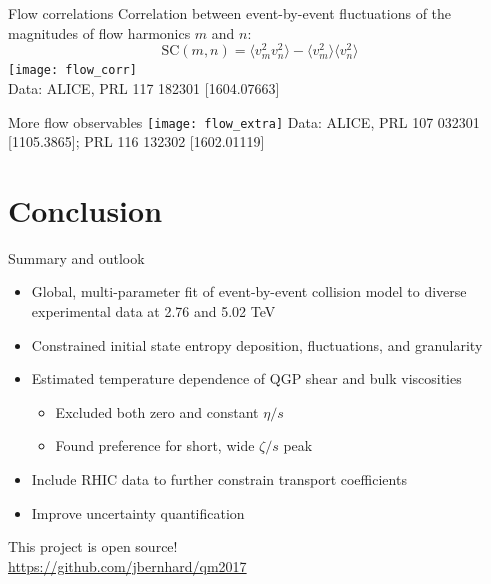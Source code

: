 \documentclass{beamer}
\begin{document}
\begin{frame}{Flow correlations}
  Correlation between event-by-event fluctuations of the magnitudes of flow harmonics $m$ and $n$:
  \begin{equation*}
    \text{SC}(m, n) = \langle v_m^2 v_n^2 \rangle  - \langle v_m^2 \rangle \langle v_n^2 \rangle
  \end{equation*}
  \texttt{[image: flow\_corr]} \\
  \tiny\flushright Data: ALICE, PRL 117 182301 [1604.07663]
\end{frame}


\begin{frame}{More flow observables}
  \texttt{[image: flow\_extra]}
  \tiny\flushright Data: ALICE, PRL 107 032301 [1105.3865]; PRL 116 132302 [1602.01119]
\end{frame}


\section{Conclusion}

\begin{frame}{Summary and outlook}
  \vspace{1em}
  \begin{itemize}
    \item Global, multi-parameter fit of event-by-event collision model to diverse experimental data at 2.76 and 5.02 TeV
    \item Constrained initial state entropy deposition, fluctuations, and granularity
    \item Estimated temperature dependence of QGP shear and bulk viscosities
      \begin{itemize}
        \item Excluded both zero and constant $\eta/s$
        \item Found preference for short, wide $\zeta/s$ peak
      \end{itemize}
  \end{itemize}
  \begin{itemize}
    \item Include RHIC data to further constrain transport coefficients
    \item Improve uncertainty quantification
  \end{itemize}
  \begin{center}
    This project is open source! \\
    \url{https://github.com/jbernhard/qm2017}
  \end{center}
\end{frame}
\end{document}
